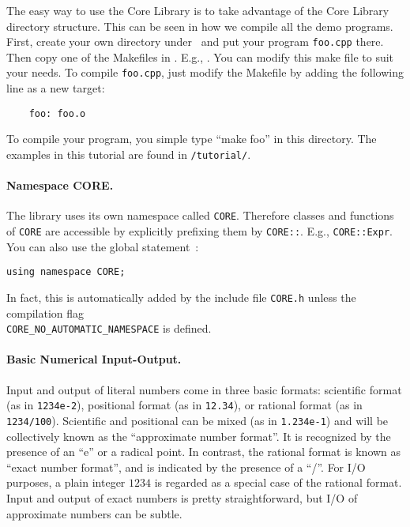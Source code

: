\documentclass[12pt]{article}
\begin{document}
The easy way to use the Core Library is to take advantage 
of the Core Library directory structure.  This can be seen
in how we compile all the demo programs.
First, create your own directory under \examplesdir\ and
put your program \texttt{foo.cpp} there.  Then copy one of the
Makefiles in \examplesdir.  E.g.,
.
You can modify this make file to suit your needs.  To compile
\texttt{foo.cpp}, just modify the Makefile by adding the
following line as a new target:
	\begin{verbatim}
	foo: foo.o
	\end{verbatim}
To compile your program, you simple type ``make foo'' in this directory.
The examples in this tutorial are found
in  \examplesdir\texttt{/tutorial/}. 

\paragraph{Namespace CORE.}
The library uses its own namespace called {\tt CORE}.
Therefore classes and functions of {\tt CORE}
are accessible by explicitly
prefixing them by {\tt CORE::}. E.g., {\tt CORE::Expr}.
You can also use the global statement~:

\begin{progb} {
\> \tt using namespace CORE;
} \end{progb}

In fact, this is automatically added by the include file
{\tt CORE.h} unless the compilation flag
\\ {\tt CORE\_NO\_AUTOMATIC\_NAMESPACE} is defined.

\paragraph{Basic Numerical Input-Output.}
Input and output of literal numbers come in three basic formats:
scientific format (as in {\tt 1234e-2}), positional format
(as in {\tt 12.34}), or rational format (as in {\tt 1234/100}).
Scientific and positional can be mixed (as in {\tt 1.234e-1})
and will be collectively known as the ``approximate number format''.
It is recognized by the presence of an ``e'' or a radical point.
In contrast, the rational format is known as ``exact number format'',
and is indicated by the presence of a ``/''.
For I/O purposes, a plain integer $1234$ is regarded 
as a special case of the rational format.  
Input and output of exact numbers is
pretty straightforward, but I/O of approximate numbers
can be subtle.
\end{document}
